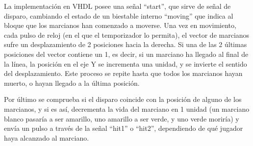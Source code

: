 La implementación en VHDL posee una señal ``start'', que sirve de señal de disparo, cambiando el estado de un biestable interno ``moving'' que indica al bloque que los marcianos han comenzado a moverse. Una vez en movimiento, cada pulso de reloj (en el que el temporizador lo permita), el vector de marcianos sufre un desplazamiento de 2 posiciones hacia la derecha. Si una de las 2 últimas posiciones del vector contiene un 1, es decir, si un marciano ha llegado al final de la línea, la posición en el eje Y se incrementa una unidad, y se invierte el sentido del desplazamiento. Este proceso se repite hasta que todos los marcianos hayan muerto, o hayan llegado a la última posición.

Por último se comprueba si el disparo coincide con la posición de alguno de los marcianos, y si es así, decrementa la vida del marciano en 1 unidad (un marciano blanco pasaría a ser amarillo, uno amarillo a ser verde, y uno verde moriría) y envía un pulso a través de la señal ``hit1'' o ``hit2'', dependiendo de qué jugador haya alcanzado al marciano.